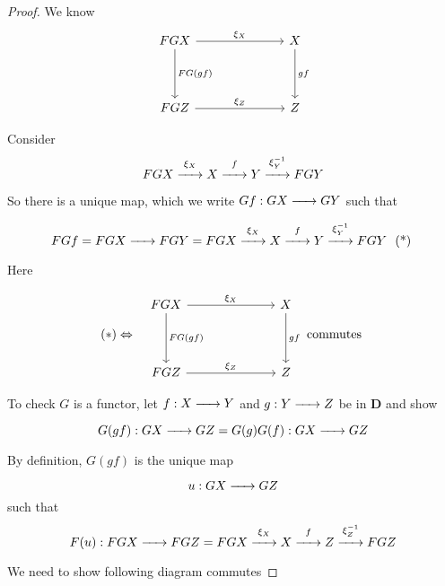 \documentclass{article}
\renewcommand{\to}{\xrightarrow{\hspace{0.5cm}}}  %
\begin{document}
\begin{proof}
        We know
        \[
            \begin{tikzcd}[column sep=7em, row sep=4em]
                FGX \arrow[r,  "\xi_X"] \arrow[d, "FG(gf)"]
                & X \arrow[d, "gf"] \\
                FGZ \arrow[r, "\xi_Z"]
                & Z
            \end{tikzcd}
        \]

        Consider
        \[
            FGX \stackrel{\xi_X}{\to} X \stackrel{f}{\to} Y \stackrel{\xi_Y^{-1}}{\to} FGY
        \]

        So there is a unique map, which we write \(Gf: GX \to GY\) such that

        \[
            FGf = FGX \to FGY = FGX \stackrel{\xi_X}{\to} X \stackrel{f}{\to} Y \stackrel{\xi_Y^{-1}}{\to} FGY \ \text{ (*) }
        \]

        Here

        \[
            \begin{array}{c c} %
            (*)
                \Leftrightarrow &
                \begin{tikzcd}[column sep=7em, row sep=4em]
                    FGX \arrow[r,  "\xi_X"] \arrow[d, "FG(gf)"]
                    & X \arrow[d, "gf"] \\
                    FGZ \arrow[r, "\xi_Z"]
                    & Z
                \end{tikzcd} \text{ commutes } \\

            \end{array}
        \]

        To check \(G\) is a functor, let \(f: X \to Y\) and \(g: Y \to Z\) be in \(\mathbf{D}\) and show

        \[
            G(gf): GX \to GZ = G(g) G(f): GX \to GZ
        \]

        By definition, \(G(gf)\) is the unique map

        \[
            u: GX \to GZ
        \]
        such that
        \[
            F(u): FGX \to FGZ = FGX \stackrel{\xi_X}{\to} X \stackrel{f}{\to} Z \stackrel{\xi_Z^{-1}}{\to} FGZ
        \]

        We need to show following diagram commutes


\end{proof}
\end{document}
